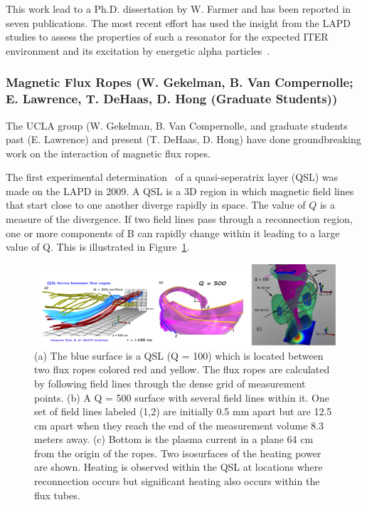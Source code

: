 \documentclass[11pt]{article}
\renewcommand{\cite}{\citep}
\begin{document}
This work lead to a Ph.D. dissertation by W. Farmer and has been
reported in seven publications. The most recent effort has used the
insight from the LAPD studies to assess the properties of such a
resonator for the expected ITER environment and its excitation by
energetic alpha particles~\cite{farmer:2014}.


\subsubsection{Magnetic Flux Ropes (W. Gekelman, B. Van Compernolle; E.
Lawrence, T. DeHaas, D. Hong (Graduate Students))}

The UCLA group (W. Gekelman, B. Van Compernolle, and graduate students
past (E. Lawrence) and present (T. DeHaas, D. Hong) have done
groundbreaking work on the interaction of magnetic flux ropes. 

The first experimental
determination~\cite{lawrence:2009} of a quasi-seperatrix layer
(QSL) was made on the LAPD in 2009. A QSL is a 3D region in which
magnetic field lines that start close to one another diverge rapidly in
space. The value of $Q$ is a measure of the divergence. If two field lines
pass through a reconnection region, one or more components of B can
rapidly change within it leading to a large value of Q. This is
illustrated in Figure~\ref{ropes}.

\begin{figure}[!htbp]
\centerline{\includegraphics[width=6.2truein]{ropes}}
\caption{(a) The blue surface is a QSL (Q = 100) which is located
between two flux ropes colored red and yellow. The flux ropes
are calculated by following field lines through the dense grid of
measurement points. (b) A Q = 500 surface with several field lines
within it. One set of field lines labeled (1,2) are initially 0.5 mm
apart but are 12.5 cm apart when they reach the end of the measurement
volume 8.3 meters away. (c) Bottom is the plasma current in a plane 64 cm from the origin
of the ropes.  Two
isosurfaces of the heating power are shown. Heating is observed within
the QSL at locations where reconnection occurs but significant heating
also occurs within the flux tubes.}\label{ropes}
\end{figure}
\end{document}
